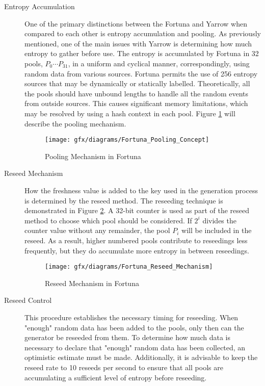 \begin{description}
	\item[Entropy Accumulation] One of the primary distinctions between the Fortuna and Yarrow when compared to each other is entropy accumulation and pooling. As previously mentioned, one of the main issues with Yarrow is determining how much entropy to gather before use. The entropy is accumulated by Fortuna in 32 pools, $P_{0}\cdots P_{31}$, in a uniform and cyclical manner, correspondingly, using random data from various sources. Fortuna permits the use of 256 entropy sources that may be dynamically or statically labelled. Theoretically, all the pools should have unbound lengths to handle all the random events from outside sources. This causes significant memory limitations, which may be resolved by using a hash context in each pool. Figure \ref{fig:3:12} will describe the pooling mechanism.
	\begin{figure}[htbp]
		\centering
		\texttt{[image: gfx/diagrams/Fortuna\_Pooling\_Concept]}
		\caption{Pooling Mechanism in Fortuna}
		\label{fig:3:12}
	\end{figure}

	\item[Reseed Mechanism] How the freshness value is added to the key used in the generation process is determined by the reseed method. The reseeding technique is demonstrated in Figure \ref{fig:3:13}. A 32-bit counter is used as part of the reseed method to choose which pool should be considered. If $2^{i}$ divides the counter value without any remainder, the pool $P_{i}$ will be included in the reseed. As a result, higher numbered pools contribute to reseedings less frequently, but they do accumulate more entropy in between reseedings.
	\begin{figure}[htbp]
		\centering
		\texttt{[image: gfx/diagrams/Fortuna\_Reseed\_Mechanism]}
		\caption{Reseed Mechanism in Fortuna}
		\label{fig:3:13}
	\end{figure}

	\item[Reseed Control] This procedure establishes the necessary timing for reseeding. When "enough" random data has been added to the pools, only then can the generator be reseeded from them. To determine how much data is necessary to declare that "enough" random data has been collected, an optimistic estimate must be made. Additionally, it is advisable to keep the reseed rate to 10 reseeds per second to ensure that all pools are accumulating a sufficient level of entropy before reseeding.
	

\end{description}
